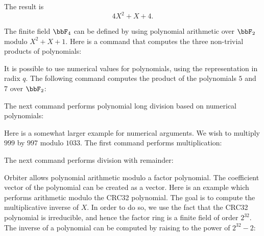 
The result is 
$$
4X^{2} + X + 4.
$$

\bigskip


The finite field $\bbF_4$ 
can be defined by using polynomial arithmetic over $\bbF_2$ 
modulo $X^2+X+1.$
Here is a command that computes the three non-trivial products of polynomials:




\bigskip

It is possible to use numerical values for polynomials, 
using the representation in radix $q.$
The following command computes the product of the polynomials $5$ and $7$ over $\bbF_2$:


The next command performs polynomial 
long division based on numerical polynomials:



\bigskip

Here is a somewhat larger example for numerical arguments. 
We wish to multiply $999$ by $997$ modulo $1033$. 
The first command performs multiplication: 


The next command performs division with remainder:






\bigskip

Orbiter allows polynomial arithmetic modulo a factor polynomial.
The coefficient vector of the polynomial can be created as a vector.
Here is an example which performs arithmetic modulo the CRC32 polynomial. 
The goal is to compute the multiplicative inverse of $X$. 
In order to do so, 
we use the fact that the CRC32 polynomial is irreducible, 
and hence the factor ring is a finite field 
of order $2^{32}.$ 
The inverse of a polynomial can be computed by raising to the 
power of $2^{32}-2$:

